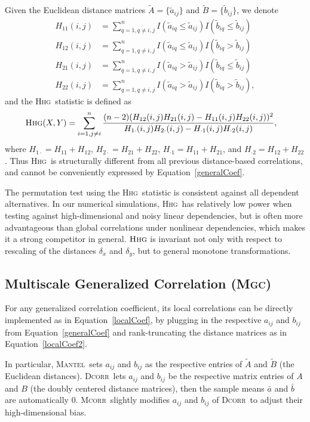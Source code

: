 \documentclass[11pt]{article}
\providecommand{\sct}[1]{{\normalfont\textsc{#1}}}
\newcommand{\Mgc}{\sct{Mgc}}
\newcommand{\Hhg}{\sct{Hhg}}
\newcommand{\Dcorr}{\sct{Dcorr}}
\newcommand{\Mcorr}{\sct{Mcorr}}
\newcommand{\Mantel}{\sct{Mantel}}
\begin{document}
Given the Euclidean distance matrices $\tilde{A}=\{\tilde{a}_{ij}\}$ and $\tilde{B}=\{\tilde{b}_{ij}\}$, we denote
\begin{align*}
H_{11}(i,j) &= \sum_{q=1,q\neq i,j}^{n}I(\tilde{a}_{iq} \leq \tilde{a}_{ij})I(\tilde{b}_{iq} \leq \tilde{b}_{ij}) \\
H_{12}(i,j) &= \sum_{q=1,q\neq i,j}^{n}I(\tilde{a}_{iq} \leq \tilde{a}_{ij})I(\tilde{b}_{iq} > \tilde{b}_{ij}) \\
H_{21}(i,j) &= \sum_{q=1,q\neq i,j}^{n}I(\tilde{a}_{iq} > \tilde{a}_{ij})I(\tilde{b}_{iq} \leq \tilde{b}_{ij}) \\
H_{22}(i,j) &= \sum_{q=1,q\neq i,j}^{n}I(\tilde{a}_{iq} > \tilde{a}_{ij})I(\tilde{b}_{iq} > \tilde{b}_{ij}),
\end{align*}
and the \Hhg~statistic is defined as
\begin{align*}
\Hhg(X,Y) &= \sum_{i=1,j\neq i}^{n} \frac{(n-2)(H_{12}(i,j)H_{21}(i,j)-H_{11}(i,j)H_{22}(i,j))^2}{H_{1 \cdot}(i,j)H_{2 \cdot}(i,j)-H_{\cdot 1}(i,j)H_{\cdot 2}(i,j)},
\end{align*}
where $H_{1 \cdot}=H_{11}+H_{12}$, $H_{2 \cdot}=H_{21}+H_{22}$, $H_{\cdot 1}=H_{11}+H_{21}$, and $H_{\cdot 2}=H_{12}+H_{22}$. Thus \Hhg~is structurally different from all previous distance-based correlations, and cannot be conveniently expressed by Equation~\ref{generalCoef}.

The permutation test using the \Hhg~statistic is consistent against all dependent alternatives. In our numerical simulations, \Hhg~has relatively low power  when testing against high-dimensional and noisy linear dependencies, but is often more advantageous than global correlations under nonlinear dependencies, which makes it a strong competitor in general. 
$\Hhg$ is invariant not only with respect to rescaling of the distances $\delta_x$ and $\delta_y$, but to general monotone transformations.

\subsection{Multiscale Generalized Correlation (\Mgc)}
\label{appen:mgc}
For any generalized correlation coefficient, its local correlations can be directly implemented as in Equation~\ref{localCoef}, by plugging in the respective $a_{ij}$ and $b_{ij}$ from Equation~\ref{generalCoef} and rank-truncating  the distance matrices  as in Equation~\ref{localCoef2}. 

In particular, \Mantel~sets $a_{ij}$ and $b_{ij}$ as the respective entries of $\tilde{A}$ and $\tilde{B}$ (the Euclidean distances). \Dcorr~lets $a_{ij}$ and $b_{ij}$ be the respective matrix entries of $A$ and $B$ (the doubly centered distance matrices), then the sample means $\bar{a}$ and $\bar{b}$ are automatically $0$. \Mcorr~slightly modifies $a_{ij}$ and $b_{ij}$ of \Dcorr~to adjust their high-dimensional bias. 
\end{document}
